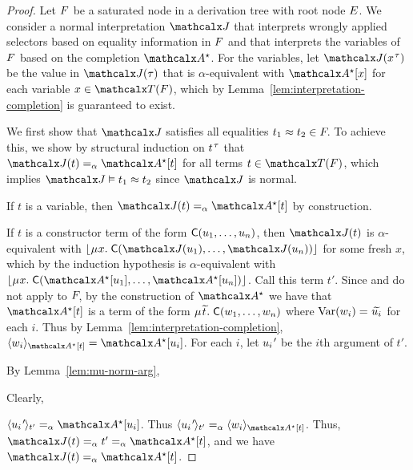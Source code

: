 \begin{proof}
Let $F$ be a saturated node in a derivation tree with root node $E$.
We consider a normal interpretation $\J$
that interprets wrongly applied selectors based on equality information in $F$
and that interprets the variables of $F$ based on the completion $\ValC$.
For the variables, let $\interp{\J}{x\typ{\tau}}$ be the value in $\J(\tau)$ that is $\alpha$-equivalent with $\ValC \ec{x}$ for each variable $x \in \Terms(\Fc)$,
which by Lemma~\ref{lem:interpretation-completion} is guaranteed to exist.

We first show that $\J$ satisfies all equalities $t_1 \approx t_2 \in F\!$. %
To achieve this, we show
by structural induction on $t\typ\tau$
that $\interp{\J}{t} \aequiv \ValC \ec{t}$ for all terms $t \in \Terms( \Fc )$,
which implies $\J \models t_1 \teq t_2$ since $\J$ is normal.

If $t$ is a variable, then $\interp{\J}{t} \vsim \ValC \ec{ t }$ by construction.

If $t$ is a constructor term of the form $\textsf{C}( u_1, \ldots, u_n )$,
then $\interp{\J}{t}$ is $\alpha$-equivalent with $\nf{\MU x.\; \const{C}( \interp{\J}{u_1}, \ldots, \interp{\J}{u_n} ) }$ for some fresh $x$,
which by the induction hypothesis is $\alpha$-equivalent with $\nf{\MU x.\; \const{C}( \ValC \ec{ u_1 }, \ldots, \ValC \ec{ u_n } )}$.
Call this term $t'$.
Since  and  do not apply to $F\!$,
by the construction of $\ValC$ we have that $\ValC \ec{t}$ is a term
of the form $\MU {\Varec{t}}.\; \const{C}( w_1,\allowbreak \ldots,\allowbreak w_n )$
where
$\muvar(w_i) = {\Varec{u_i}}$ for each $i$.  Thus by Lemma~\ref{lem:interpretation-completion},
$\expand{\ValC \ec{t}}{w_i} = \ValC \ec{u_i}$.
For each $i$, let $u_\iPrime$ be the $i$\vvthinspace th argument of $t'$.
\begin{rep}By Lemma~\ref{lem:mu-norm-arg},\end{rep}%
\begin{conf}Clearly,\end{conf} %
$\expand{t'}{u_\iPrime} \vsim \ValC \ec{u_i}$.
Thus $\expand{t'}{u_\iPrime} \vsim \expand{\ValC \ec{t}}{ w_i }$. %
Thus, $\interp{\J}{t} \vsim t' \vsim \ValC \ec{t}$, and
we have $\interp{\J}{t} \vsim \ValC \ec{t}$.


\end{proof}
